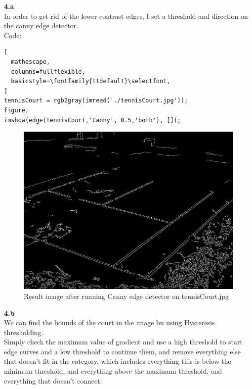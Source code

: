 \documentclass[11pt]{article}
\begin{document}
\newpage
\noindent
\textbf{4.a} \\
In order to get rid of the lower contrast edges, I set a threshold and direction on the canny edge detector. \\
Code:
\begin{lstlisting}[
  mathescape,
  columns=fullflexible,
  basicstyle=\fontfamily{ttdefault}\selectfont,
]
tennisCourt = rgb2gray(imread('./tennisCourt.jpg'));
figure;
imshow(edge(tennisCourt,'Canny', 0.5,'both'), []);
\end{lstlisting}
\begin{figure}[h]
  \caption{Result image after running Canny edge detector on tennisCourt.jpg}
    \includegraphics[width=1\textwidth]{4a}
\end{figure}

\noindent
\textbf{4.b} \\
We can find the bounds of the court in the image bu using Hysteresis thresholding. \\
Simply check the maximum value of gradient and use a high threshold to start edge curves and a low
threshold to continue them, and remove everything else that doesn't fit in the category, which includes everything this is below the minimum threshold, and everything above the maximum threshold, and everything that doesn't connect. \\
\end{document}
